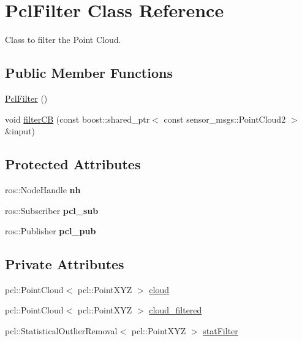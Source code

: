 \hypertarget{classPclFilter}{}\section{Pcl\+Filter Class Reference}
\label{classPclFilter}


Class to filter the Point Cloud.  


\subsection*{Public Member Functions}
\begin{DoxyCompactItemize}
\item 
\hyperlink{classPclFilter_a6fdc19ebc1821b00c7becccd251e010a}{Pcl\+Filter} ()
\item 
void \hyperlink{classPclFilter_a2f12ba73fa3b2c3a97978d20ea7909d1}{filter\+CB} (const boost\+::shared\+\_\+ptr$<$ const sensor\+\_\+msgs\+::\+Point\+Cloud2 $>$ \&input)
\end{DoxyCompactItemize}
\subsection*{Protected Attributes}
\begin{DoxyCompactItemize}
\item 
ros\+::\+Node\+Handle {\bfseries nh}\hypertarget{classPclFilter_a0777606b8bbca26a783c1276405b0256}{}\label{classPclFilter_a0777606b8bbca26a783c1276405b0256}

\item 
ros\+::\+Subscriber {\bfseries pcl\+\_\+sub}\hypertarget{classPclFilter_a553c3349ea2f3a5d890893cf8dcf5352}{}\label{classPclFilter_a553c3349ea2f3a5d890893cf8dcf5352}

\item 
ros\+::\+Publisher {\bfseries pcl\+\_\+pub}\hypertarget{classPclFilter_afa21edff9a4d7cdd6f1bd1f02d819eee}{}\label{classPclFilter_afa21edff9a4d7cdd6f1bd1f02d819eee}

\end{DoxyCompactItemize}
\subsection*{Private Attributes}
\begin{DoxyCompactItemize}
\item 
pcl\+::\+Point\+Cloud$<$ pcl\+::\+Point\+X\+YZ $>$ \hyperlink{classPclFilter_af18d36d2d1c3fcbba45be49a32ae9e11}{cloud}
\item 
pcl\+::\+Point\+Cloud$<$ pcl\+::\+Point\+X\+YZ $>$ \hyperlink{classPclFilter_a06aae25878fdd6c3aad05fa00f4c0f07}{cloud\+\_\+filtered}
\item 
pcl\+::\+Statistical\+Outlier\+Removal$<$ pcl\+::\+Point\+X\+YZ $>$ \hyperlink{classPclFilter_a8e402978eb3fdedcbee54554fe55c259}{stat\+Filter}
\end{DoxyCompactItemize}


